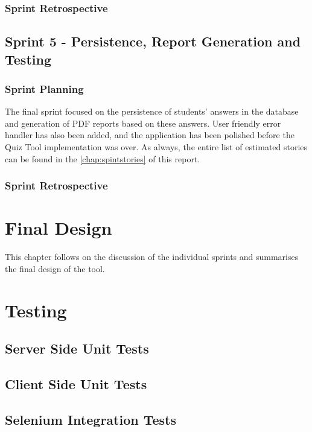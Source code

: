 \subsection{Sprint Retrospective}
\section{Sprint 5 - Persistence, Report Generation and Testing}
\subsection{Sprint Planning}
The final sprint focused on the persistence of students' answers in the database and
generation of PDF reports based on these answers. User friendly error handler has
also been added, and the application has been polished before the Quiz Tool implementation
was over. As always, the entire list of estimated stories
can be found in the \autoref{chap:spintstories} of this report.

\subsection{Sprint Retrospective}

\chapter{Final Design}

This chapter follows on the discussion of the individual sprints and summarises
the final design of the tool.

\chapter{Testing}

\section{Server Side Unit Tests}
\section{Client Side Unit Tests}
\section{Selenium Integration Tests}

